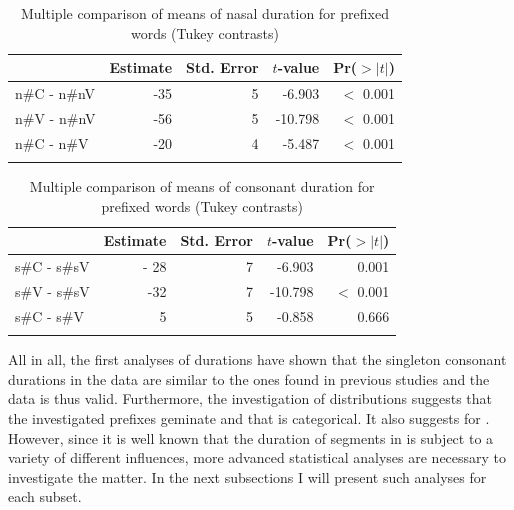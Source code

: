   \begin{table}
  	\caption{Multiple comparison of means of nasal duration for prefixed words (Tukey contrasts)}
  	\label{tbl:Tukey un}
  	
  		\begin{tabular} {lrrrr}
			
			
			\lsptoprule
  			& Estimate & Std. Error & $t$-value  & Pr($>$$|$$t$$|$)    \\
  			\midrule
  			n\#C - n\#nV  &-35  &  5 & -6.903 & $<$ 0.001\\
  			n\#V - n\#nV & -56 &  5 & -10.798 & $<$ 0.001\\
  			n\#C - n\#V  & -20 & 4 & -5.487 & $<$ 0.001 \\
  			\lspbottomrule                                                                                
		\end{tabular}
  	
  \end{table}
  
  
  
  \begin{table}
  	\caption{Multiple comparison of means of consonant duration for prefixed words (Tukey contrasts)}
  	\label{tbl:Tukey dis}
  	
  		\begin{tabular} {lrrrr}
			
			
			\lsptoprule
  			& Estimate & Std. Error & $t$-value  & Pr($>$$|$$t$$|$)    \\
  			\midrule
  			s\#C - s\#sV  &  - 28 &  7  & -6.903 & 0.001\\
  			s\#V - s\#sV & -32  &  7  & -10.798 &$<$ 0.001\\
  			s\#C - s\#V    &  {5}       &  5  &  -0.858  &  0.666  \\
  			  			\lspbottomrule                                                                                
		\end{tabular}

  	
  \end{table}
  
  

					

All in all, the first analyses of durations have shown that the singleton consonant durations in the data are similar to the ones found in previous studies and the data is thus valid. Furthermore, the investigation of distributions suggests that the investigated prefixes geminate and that  is categorical. It also suggests  for . 
However, since it is well known that the duration of segments in  is subject to a variety of different influences, more advanced statistical analyses are necessary to investigate the matter. In the next subsections I will present such analyses for each subset.



